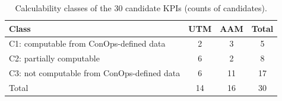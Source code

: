 \begin{table}[!t]
\caption{Calculability classes of the 30 candidate KPIs (counts of candidates).}
\label{tab:calculability-summary}
\centering
\footnotesize
\renewcommand{\arraystretch}{1.12}
\begin{tabular}{@{}lccc@{}}
\toprule
\textbf{Class} & \textbf{UTM} & \textbf{AAM} & \textbf{Total} \\
\midrule
C1: computable from ConOps-defined data & 2 & 3 & 5 \\
C2: partially computable & 6 & 2 & 8 \\
C3: not computable from ConOps-defined data & 6 & 11 & 17 \\
\midrule
Total & 14 & 16 & 30 \\
\bottomrule
\end{tabular}
\end{table}
